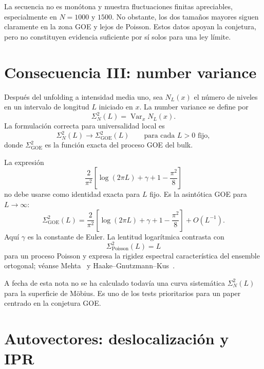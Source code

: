 \documentclass[11pt,a4paper]{article}
\newcommand{\GOE}{\mathrm{GOE}}
\newcommand{\Poisson}{\mathrm{Poisson}}
\begin{document}
La secuencia no es monótona y muestra fluctuaciones finitas apreciables, especialmente en $N=1000$ y $1500$. No obstante, los dos tamaños mayores siguen claramente en la zona GOE y lejos de Poisson. Estos datos apoyan la conjetura, pero no constituyen evidencia suficiente por sí solos para una ley límite.

\section{Consecuencia III: number variance}

Después del unfolding a intensidad media uno, sea $N_L(x)$ el número de niveles en un intervalo de longitud $L$ iniciado en $x$. La number variance se define por
\begin{equation}
\Sigma_N^2(L)
=\operatorname{Var}_x N_L(x).
\end{equation}
La formulación correcta para universalidad local es
\begin{equation}
\boxed{
\Sigma_N^2(L)\longrightarrow\Sigma_{\GOE}^2(L)
\qquad\text{para cada }L>0\text{ fijo},
}
\label{eq:numbervariance-fixed}
\end{equation}
donde $\Sigma_{\GOE}^2$ es la función exacta del proceso GOE del bulk.

La expresión
\begin{equation}
\frac{2}{\pi^2}
\left[
\log(2\pi L)+\gamma+1-\frac{\pi^2}{8}
\right]
\label{eq:numbervariance-asymp-main}
\end{equation}
no debe usarse como identidad exacta para $L$ fijo. Es la asintótica GOE para $L\to\infty$:
\begin{equation}
\boxed{
\Sigma_{\GOE}^2(L)
=
\frac{2}{\pi^2}
\left[
\log(2\pi L)+\gamma+1-\frac{\pi^2}{8}
\right]
+O(L^{-1}).
}
\label{eq:numbervariance-asymptotic}
\end{equation}
Aquí $\gamma$ es la constante de Euler. La lentitud logarítmica contrasta con
\begin{equation}
\Sigma_{\Poisson}^2(L)=L
\end{equation}
para un proceso Poisson y expresa la rigidez espectral característica del ensemble ortogonal; véanse Mehta~\cite{Mehta2004} y Haake--Gnutzmann--Kus~\cite{Haake2018}.

A fecha de esta nota no se ha calculado todavía una curva sistemática $\Sigma_N^2(L)$ para la superficie de Möbius. Es uno de los tests prioritarios para un paper centrado en la conjetura GOE.

\section{Autovectores: deslocalización y IPR}
\end{document}
